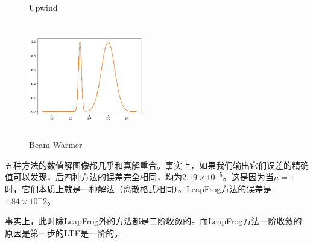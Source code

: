 \documentclass{ctexart}
\begin{document}
\begin{figure}[htbp]
\begin{minipage}{5cm}
		\caption{Upwind}
		\label{adv9}
	\end{minipage}
	\begin{minipage}{5cm}
		\centering
		\includegraphics[width = 5cm, height = 5cm]{3-10.png}
		\caption{Beam-Warmer}
		\label{adv10}
	\end{minipage}
\end{figure}

五种方法的数值解图像都几乎和真解重合。事实上，如果我们输出它们误差的精确值可以发现，后四种方法的误差完全相同，均为$2.19\times 10^{-5}$。这是因为当$\mu=1$时，它们本质上就是一种解法（离散格式相同）。LeapFrog方法的误差是$1.84\times 10^-2$。

事实上，此时除LeapFrog外的方法都是二阶收敛的。而LeapFrog方法一阶收敛的原因是第一步的LTE是一阶的。
\end{document}

